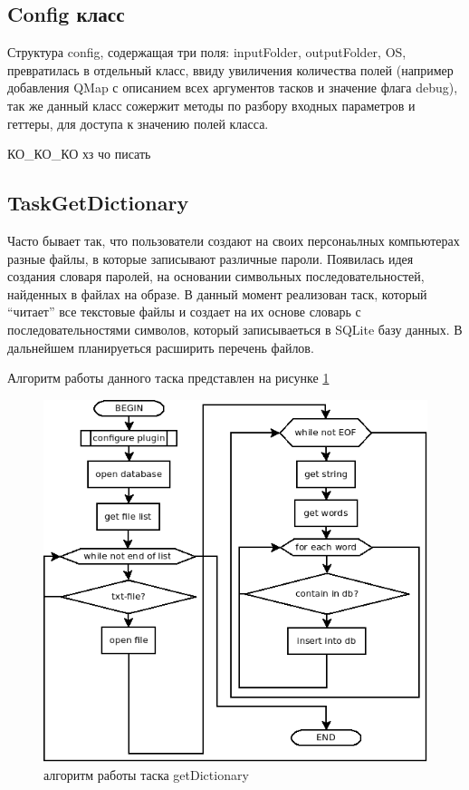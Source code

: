 \subsection{Config класс}

Структура config, содержащая три поля: inputFolder, outputFolder, OS, превратилась в отдельный класс, ввиду увиличения количества полей (например добавления QMap с описанием всех аргументов тасков и значение флага debug), так же данный класс сожержит методы по разбору входных параметров и геттеры, для доступа к значению полей класса. 

КО\_КО\_КО хз чо писать %

\subsection{TaskGetDictionary}

Часто бывает так, что пользователи создают на своих персонаьлных компьютерах разные файлы, в которые записывают различные пароли. Появилась идея создания словаря паролей, на основании символьных последовательностей, найденных в файлах на образе. В данный момент реализован таск, который ``читает'' все текстовые файлы и создает на их основе словарь с последовательностями символов, который записываеться в SQLite базу данных. В дальнейшем планируеться расширить перечень файлов.

Алгоритм работы данного таска представлен на рисунке \ref{png:TaskGetDictionary}

\begin{figure}
 \includegraphics{getDict.png}
 \caption{алгоритм работы таска getDictionary}
 \label{png:TaskGetDictionary}
\end{figure}
